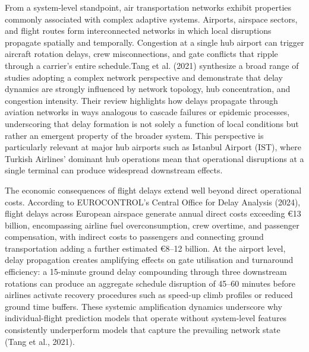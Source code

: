 \documentclass{report}
\begin{document}
From a system-level standpoint, air transportation networks exhibit properties commonly associated with complex adaptive systems. Airports, airspace sectors, and flight routes form interconnected networks in which local disruptions propagate spatially and temporally. Congestion at a single hub airport can trigger aircraft rotation delays, crew misconnections, and gate conflicts that ripple through a carrier's entire schedule.Tang et al. (2021) synthesize a broad range of studies adopting a complex network perspective and demonstrate that delay dynamics are strongly influenced by network topology, hub concentration, and congestion intensity. Their review highlights how delays propagate through aviation networks in ways analogous to cascade failures or epidemic processes, underscoring that delay formation is not solely a function of local conditions but rather an emergent property of the broader system. This perspective is particularly relevant at major hub airports such as Istanbul Airport (IST), where Turkish Airlines' dominant hub operations mean that operational disruptions at a single terminal can produce widespread downstream effects.

The economic consequences of flight delays extend well beyond direct operational
costs. According to EUROCONTROL's Central Office for Delay Analysis (2024),
flight delays across European airspace generate annual direct costs exceeding
\euro13 billion, encompassing airline fuel overconsumption, crew overtime, and
passenger compensation, with indirect costs to passengers and connecting ground
transportation adding a further estimated \euro8--12 billion. At the airport
level, delay propagation creates amplifying effects on gate utilisation and
turnaround efficiency: a 15-minute ground delay compounding through three
downstream rotations can produce an aggregate schedule disruption of 45--60
minutes before airlines activate recovery procedures such as speed-up climb
profiles or reduced ground time buffers. These systemic amplification dynamics
underscore why individual-flight prediction models that operate without
system-level features consistently underperform models that capture the
prevailing network state (Tang et al., 2021).
\end{document}
